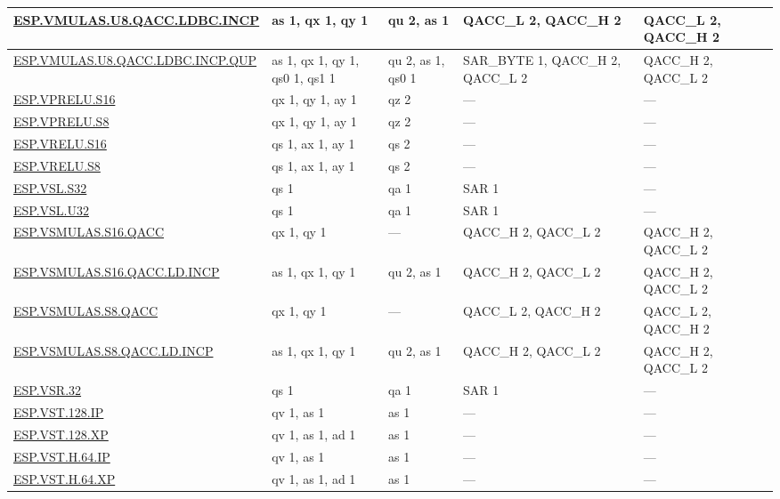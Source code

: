 \begin{longtable}[c]{|l|m{2.5cm}|m{2.5cm}|m{2.5cm}|m{2.5cm}|}
    \hyperref[instruction:ESPVMULASU8QACCLDBCINCP]{ESP.VMULAS.U8.QACC.LDBC.INCP} & as 1, qx 1, qy 1 & qu 2, as 1 & QACC\_L 2, QACC\_H 2 & QACC\_L 2, QACC\_H 2\\\hline
    \hyperref[instruction:ESPVMULASU8QACCLDBCINCPQUP]{ESP.VMULAS.U8.QACC.LDBC.INCP.QUP} & as 1, qx 1, qy 1, qs0 1, qs1 1 & qu 2, as 1, qs0 1 & SAR\_BYTE 1, QACC\_H 2, QACC\_L 2 & QACC\_H 2, QACC\_L 2\\\hline
    \hyperref[instruction:ESPVPRELUS16]{ESP.VPRELU.S16} & qx 1, qy 1, ay 1 & qz 2 & — & — \\\hline
    \hyperref[instruction:ESPVPRELUS8]{ESP.VPRELU.S8} & qx 1, qy 1, ay 1 & qz 2 & — & — \\\hline
    \hyperref[instruction:ESPVRELUS16]{ESP.VRELU.S16} & qs 1, ax 1, ay 1 & qs 2 & — & — \\\hline
    \hyperref[instruction:ESPVRELUS8]{ESP.VRELU.S8} & qs 1, ax 1, ay 1 & qs 2 & — & — \\\hline
    \hyperref[instruction:ESPVSLS32]{ESP.VSL.S32} & qs 1 & qa 1 & SAR 1 & — \\\hline
    \hyperref[instruction:ESPVSLU32]{ESP.VSL.U32} & qs 1 & qa 1 & SAR 1 & — \\\hline
    \hyperref[instruction:ESPVSMULASS16QACC]{ESP.VSMULAS.S16.QACC} & qx 1, qy 1 & — & QACC\_H 2, QACC\_L 2 & QACC\_H 2, QACC\_L 2\\\hline
    \hyperref[instruction:ESPVSMULASS16QACCLDINCP]{ESP.VSMULAS.S16.QACC.LD.INCP} & as 1, qx 1, qy 1 & qu 2, as 1 & QACC\_H 2, QACC\_L 2 & QACC\_H 2, QACC\_L 2\\\hline
    \hyperref[instruction:ESPVSMULASS8QACC]{ESP.VSMULAS.S8.QACC} & qx 1, qy 1 & — & QACC\_L 2, QACC\_H 2 & QACC\_L 2, QACC\_H 2\\\hline
    \hyperref[instruction:ESPVSMULASS8QACCLDINCP]{ESP.VSMULAS.S8.QACC.LD.INCP} & as 1, qx 1, qy 1 & qu 2, as 1 & QACC\_H 2, QACC\_L 2 & QACC\_H 2, QACC\_L 2\\\hline
    \hyperref[instruction:ESPVSR32]{ESP.VSR.32} & qs 1 & qa 1 & SAR 1 & — \\\hline
    \hyperref[instruction:ESPVST128IP]{ESP.VST.128.IP} & qv 1, as 1 & as 1 & — & — \\\hline
    \hyperref[instruction:ESPVST128XP]{ESP.VST.128.XP} & qv 1, as 1, ad 1 & as 1 & — & — \\\hline
    \hyperref[instruction:ESPVSTH64IP]{ESP.VST.H.64.IP} & qv 1, as 1 & as 1 & — & — \\\hline
    \hyperref[instruction:ESPVSTH64XP]{ESP.VST.H.64.XP} & qv 1, as 1, ad 1 & as 1 & — & — \\\hline

\end{longtable}
